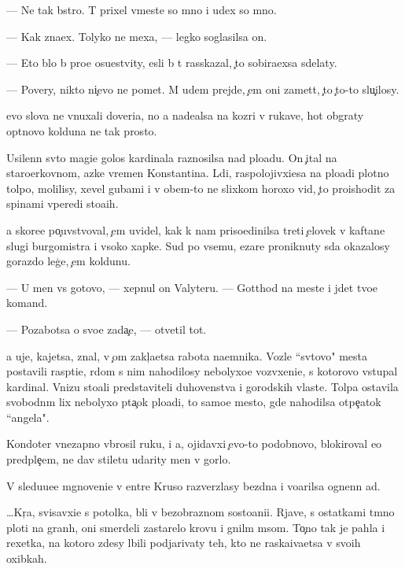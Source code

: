 \documentclass[10pt]{book}
\begin{document}
— Ne tak b{\yi}stro. T{\yi} prixel vmeste so mno{\y} i u{\y}dex so mno{\y}.

— Kak zna{\y}ex. Tolyko ne mexa{\y}, — legko soglasilsa on.

— Eto b{\yi}lo b{\yi} pro{\x}e osu{\x}estvity, {\y}esli b{\yi} t{\yi} rasskazal, {\c}to sobira{\y}exsa sdelaty.

— Povery, nikto ni{\c}evo ne po{\y}met. M{\yi} u{\y}dem prejde, {\c}em oni zamet{\ia}t, {\c}to {\c}to-to slu{\c}ilosy.

{\Y}evo slova ne vnuxali doveri{\y}a, no {\y}a nade{\y}alsa na koz{\yi}ri v rukave, hot{\ia} ob{\yi}graty op{\yi}tnovo kolduna ne tak prosto.

Usilenn{\yi}{\y} sv{\ia}to{\y} magi{\y}e{\y} golos kardinala raznosilsa nad plo{\x}ad{\y}u. On {\c}ital na staro{\q}erkovnom, {\y}az{\yi}ke vremen Konstantina. L{\iu}di, raspolojivxi{\y}esa na plo{\x}adi plotno{\y} tolpo{\y}, molilisy, xevel{\ia} gubami i v ob{\x}em-to ne slixkom horoxo vid{\ia}, {\c}to proishodit za spinami vperedi sto{\y}a{\x}ih.

{\Y}a skore{\y}e po{\c}uvstvoval, {\c}em uvidel, kak k nam priso{\y}edinilsa treti{\y} {\c}elovek v kaftane slugi burgomistra i v{\yi}soko{\y} xapke. Sud{\ia} po vsemu, {\C}ezare proniknuty s{\iu}da okazalosy gorazdo leg{\c}e, {\c}em koldunu.

— U men{\ia} vs{\e} gotovo, — xepnul on Valyteru. — Gotthod na meste i jdet tvo{\y}e{\y} komand{\yi}.

— Pozabotsa o svo{\y}e{\y} zada{\c}e, — otvetil tot.

{\Y}a uje, kajetsa, znal, v {\c}om zakl{\iu}{\c}a{\y}etsa rabota na{\y}emnika. Vozle ``sv{\ia}tovo" mesta postavili rasp{\ia}ti{\y}e, r{\ia}dom s nim nahodilosy nebolyxo{\y}e vozv{\yi}xeni{\y}e, s kotorovo v{\yi}stupal kardinal. Vnizu sto{\y}ali predstaviteli duhovenstva i gorodskih vlaste{\y}. Tolpa ostavila svobodn{\yi}m lix nebolyxo{\y} p{\ia}ta{\c}ok plo{\x}adi, to samo{\y}e mesto, gde nahodilsa otpe{\c}atok ``angela".

Kondot{\y}er vnezapno v{\yi}brosil ruku, i {\y}a, ojidavxi{\y} {\c}evo-to podobnovo, blokiroval {\y}e{\y}o predple{\c}{\y}em, ne dav stiletu udarity men{\ia} v gorlo.

V sledu{\y}u{\x}e{\y}e mgnoveni{\y}e v {\q}entre Kruso razverzlasy bezdna i vo{\q}arilsa ognenn{\yi}{\y} ad.



…Kr{\iu}{\c}{\y}a, svisavxi{\y}e s potolka, b{\yi}li v bezobraznom sosto{\y}ani{\y}i. Rjav{\yi}{\y}e, s ostatkami t{\e}mno{\y} ploti na gran{\ia}h, oni smerdeli zastarelo{\y} krov{\y}u i gnil{\yi}m m{\ia}som. To{\c}no tak je pahla i rexetka, na kotoro{\y} zdesy l{\iu}bili podjarivaty teh, kto ne raska{\y}iva{\y}etsa v svo{\y}ih oxibkah.
\end{document}
